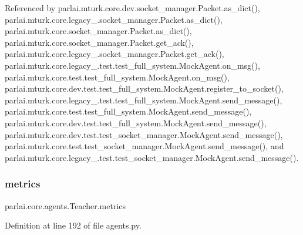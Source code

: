 Referenced by parlai.\+mturk.\+core.\+dev.\+socket\+\_\+manager.\+Packet.\+as\+\_\+dict(), parlai.\+mturk.\+core.\+legacy\+\_.\+socket\+\_\+manager.\+Packet.\+as\+\_\+dict(), parlai.\+mturk.\+core.\+socket\+\_\+manager.\+Packet.\+as\+\_\+dict(), parlai.\+mturk.\+core.\+socket\+\_\+manager.\+Packet.\+get\+\_\+ack(), parlai.\+mturk.\+core.\+legacy\+\_.\+socket\+\_\+manager.\+Packet.\+get\+\_\+ack(), parlai.\+mturk.\+core.\+legacy\+\_.\+test.\+test\+\_\+full\+\_\+system.\+Mock\+Agent.\+on\+\_\+msg(), parlai.\+mturk.\+core.\+test.\+test\+\_\+full\+\_\+system.\+Mock\+Agent.\+on\+\_\+msg(), parlai.\+mturk.\+core.\+dev.\+test.\+test\+\_\+full\+\_\+system.\+Mock\+Agent.\+register\+\_\+to\+\_\+socket(), parlai.\+mturk.\+core.\+legacy\+\_.\+test.\+test\+\_\+full\+\_\+system.\+Mock\+Agent.\+send\+\_\+message(), parlai.\+mturk.\+core.\+test.\+test\+\_\+full\+\_\+system.\+Mock\+Agent.\+send\+\_\+message(), parlai.\+mturk.\+core.\+dev.\+test.\+test\+\_\+full\+\_\+system.\+Mock\+Agent.\+send\+\_\+message(), parlai.\+mturk.\+core.\+dev.\+test.\+test\+\_\+socket\+\_\+manager.\+Mock\+Agent.\+send\+\_\+message(), parlai.\+mturk.\+core.\+test.\+test\+\_\+socket\+\_\+manager.\+Mock\+Agent.\+send\+\_\+message(), and parlai.\+mturk.\+core.\+legacy\+\_.\+test.\+test\+\_\+socket\+\_\+manager.\+Mock\+Agent.\+send\+\_\+message().

\mbox{\label{classparlai_1_1core_1_1agents_1_1Teacher_a159705efe2a9f389d8adfdad76891f08}} 
\subsubsection{\texorpdfstring{metrics}{metrics}}
{\footnotesize\ttfamily parlai.\+core.\+agents.\+Teacher.\+metrics}



Definition at line 192 of file agents.\+py.



